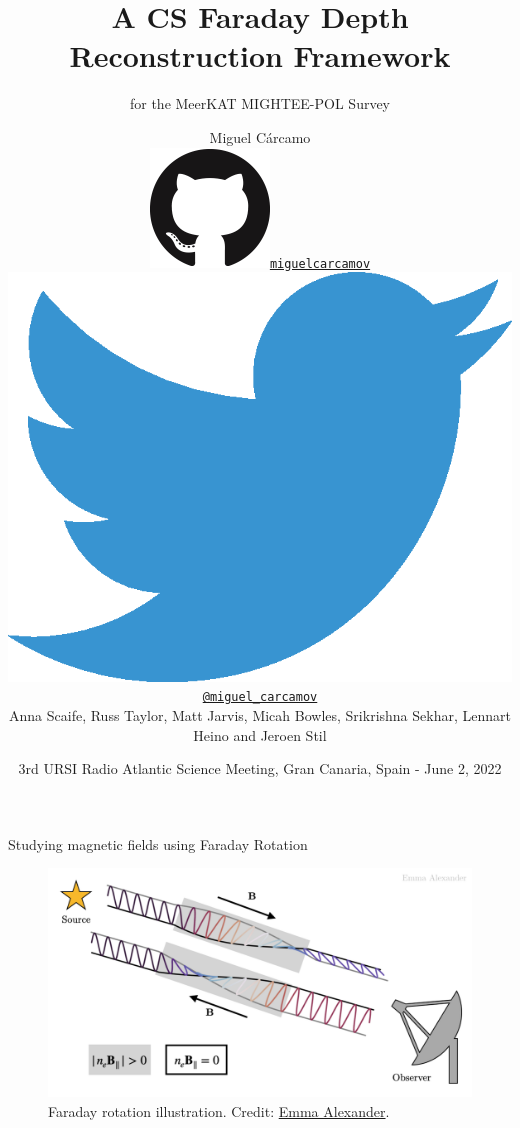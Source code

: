 \documentclass[xetex,aspectratio=169]{beamer}
\date{3rd URSI Radio Atlantic Science Meeting, Gran Canaria, Spain - June 2, 2022}
\title
    {A CS Faraday Depth Reconstruction Framework}
\subtitle
    { for the MeerKAT MIGHTEE-POL Survey}
\author
    {Miguel C\'arcamo\\
    \includegraphics[scale=0.08]{figures/logos/GitHub-Mark-120px-plus.png}\hspace{0.05cm}\href{https://www.github.com/miguelcarcamov}{\tt miguelcarcamov}\\
    \includegraphics[scale=0.05]{figures/logos/2021 Twitter logo - blue.eps}\hspace{0.05cm}\href{https://www.twitter.com/miguel_carcamov}{\tt @miguel\_carcamov}\\
    \vspace{0.5cm}
    Anna Scaife, Russ Taylor, Matt Jarvis, Micah Bowles, Srikrishna Sekhar, Lennart Heino and Jeroen Stil\\
    }
\begin{document}
\frame[plain]{\titlepage}



\begin{frame}{Studying magnetic fields using Faraday Rotation}
	\begin{figure}
		\centering
		\includegraphics[width=.8\textwidth]{figures/faraday_rot.png}
		\caption*{Faraday rotation illustration. Credit: \href{https://emmaalexander.github.io/resources.html}{Emma Alexander}.}
	\end{figure}
\end{frame}
\end{document}
